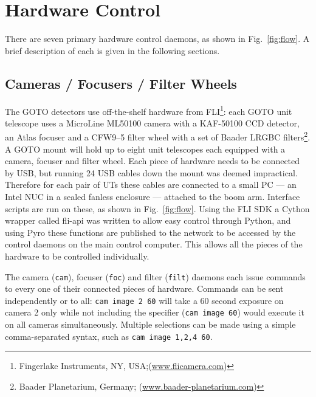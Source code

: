 \section{Hardware Control}
\label{sec:hardware_control}
\begin{colsection}


\begin{colsection}

There are seven primary hardware control daemons, as shown in Fig.~\ref{fig:flow}. A brief description of each is given in the following sections.

\end{colsection}


\subsection{Cameras / Focusers / Filter Wheels}
\label{sec:fli}
\begin{colsection}

The GOTO detectors use off-the-shelf hardware from FLI\footnote{Fingerlake Instruments, NY, USA;\@ (\url{www.flicamera.com})}: each GOTO unit telescope uses a MicroLine ML50100 camera with a KAF-50100 CCD detector, an Atlas focuser and a CFW9--5 filter wheel with a set of Baader LRGBC filters\footnote{Baader Planetarium, Germany; (\url{www.baader-planetarium.com})}. A GOTO mount will hold up to eight unit telescopes each equipped with a camera, focuser and filter wheel. Each piece of hardware needs to be connected by USB, but running 24 USB cables down the mount was deemed impractical. Therefore for each pair of UTs these cables are connected to a small PC --- an Intel NUC in a sealed fanless enclosure --- attached to the boom arm. Interface scripts are run on these, as shown in Fig.~\ref{fig:flow}. Using the FLI SDK a Cython wrapper called \textsf{fli-api} was written to allow easy control through Python, and using \textsf{Pyro} these functions are published to the network to be accessed by the control daemons on the main control computer. This allows all the pieces of the hardware to be controlled individually.

The camera (\texttt{cam}), focuser (\texttt{foc}) and filter (\texttt{filt}) daemons each issue commands to every one of their connected pieces of hardware. Commands can be sent independently or to all: \texttt{cam~image~2~60} will take a 60 second exposure on camera 2 only while not including the specifier (\texttt{cam~image~60}) would execute it on all cameras simultaneously. Multiple selections can be made using a simple comma-separated syntax, such as \texttt{cam~image~1,2,4~60}.


\end{colsection}
\end{colsection}
